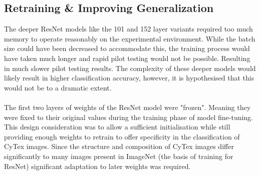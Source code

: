 \subsection{Retraining \& Improving Generalization}
The deeper ResNet models like the 101 and 152 layer variants required too much memory to operate reasonably on the experimental environment. While the batch size could have been decreased to accommodate this, the training process would have taken much longer and rapid pilot testing would not be possible. Resulting in much slower pilot testing results. The complexity of these deeper models would likely result in higher classification accuracy, however, it is hypothesised that this would not be to a dramatic extent.\\ \\
The first two layers of weights of the ResNet model were "frozen". Meaning they were fixed to their original values during the training phase of model fine-tuning. This design consideration was to allow a sufficient initialisation while still providing enough weights to retrain to offer specificity in the classification of CyTex images. Since the structure and composition of CyTex images differ significantly to many images present in ImageNet (the basis of training for ResNet) significant adaptation to later weights was required.\\ \\
